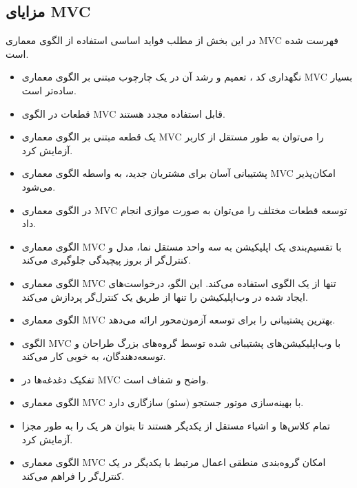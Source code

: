 \subsection{مزایای MVC}
در این بخش از مطلب فواید اساسی استفاده از الگوی معماری MVC فهرست شده است.
\begin{itemize}
	\item
	نگهداری کد
	، تعمیم و رشد آن در یک چارچوب مبتنی بر الگوی معماری MVC بسیار ساده‌تر است.
	\item
	قطعات در الگوی MVC‌ قابل استفاده مجدد هستند.
	\item
	یک قطعه مبتنی بر الگوی معماری MVC‌ را می‌توان به طور مستقل از کاربر آزمایش کرد.
	\item
	پشتیبانی آسان برای مشتریان جدید، به واسطه الگوی معماری MVC امکان‌پذیر می‌شود.
	\item
	در الگوی معماری MVC توسعه قطعات مختلف را می‌توان به صورت موازی انجام داد.
	\item
	الگوی معماری MVC با تقسیم‌بندی یک اپلیکیشن به سه واحد مستقل نما، مدل و کنترل‌گر از بروز پیچیدگی جلوگیری می‌کند.
	\item
	الگوی معماری MVC تنها از یک الگوی
	 استفاده می‌کند. این الگو، درخواست‌های ایجاد شده در وب‌اپلیکیشن را تنها از طریق یک کنترل‌گر پردازش می‌کند.
	\item
	الگوی معماری MVC بهترین پشتیبانی را برای توسعه 
	آزمون‌محور
	 ارائه می‌دهد.
	\item
	الگوی MVC با وب‌اپلیکیشن‌های پشتیبانی شده توسط گروه‌های بزرگ طراحان و توسعه‌دهندگان، به خوبی کار می‌کند.
	\item
	تفکیک دغدغه‌ها
	 در MVC واضح و شفاف است.
	\item
	الگوی معماری MVC با بهینه‌سازی موتور جستجو (سئو) سازگاری دارد.
	\item
	تمام کلاس‌ها و اشیاء مستقل از یکدیگر هستند تا بتوان هر یک را به طور مجزا آزمایش کرد.
	\item
	الگوی معماری MVC امکان گروه‌بندی منطقی اعمال مرتبط با یکدیگر در یک کنترل‌گر را فراهم می‌کند.
\end{itemize}

